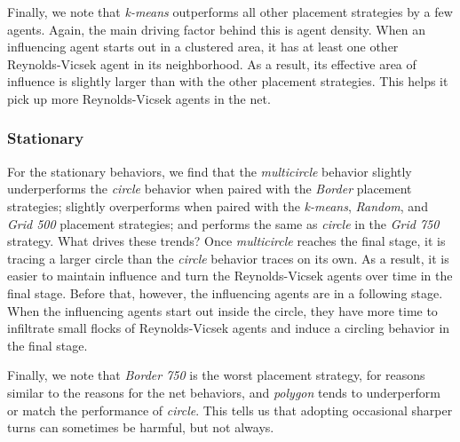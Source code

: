 Finally, we note that \textit{k-means} outperforms all other placement strategies
by a few agents.
Again, the main driving factor behind this is agent density.
When an influencing agent starts out in a clustered area, it has at least one
other Reynolds-Vicsek agent in its neighborhood.
As a result, its effective area of influence is slightly larger than with the
other placement strategies.
This helps it pick up more Reynolds-Vicsek agents in the net.

\subsubsection{Stationary}
For the stationary behaviors, we find that the \textit{multicircle} behavior
slightly underperforms the \textit{circle} behavior when paired with the
\textit{Border} placement strategies; slightly overperforms when paired
with the  \textit{k-means}, \textit{Random}, and \textit{Grid 500} placement
strategies; and performs the same as \textit{circle} in the \textit{Grid 750}
strategy.
What drives these trends?
Once \textit{multicircle} reaches the final stage, it is tracing a larger
circle than the \textit{circle} behavior traces on its own.
As a result, it is easier to maintain influence and turn the Reynolds-Vicsek
agents over time in the final stage.
Before that, however, the influencing agents are in a following stage.
When the influencing agents start out inside the circle, they have more time to
infiltrate small flocks of Reynolds-Vicsek agents and induce a circling
behavior in the final stage.

Finally, we note that \textit{Border 750} is the worst placement strategy,
for reasons similar to the reasons for the net behaviors, and \textit{polygon}
tends to underperform or match the performance of \textit{circle}.
This tells us that adopting occasional sharper turns can sometimes be harmful,
but not always.

